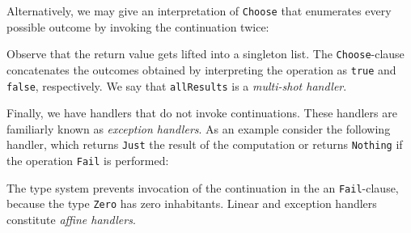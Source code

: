 \documentclass[preprint,numbers]{sigplanconf}
\newcommand{\msgbox}[2]{{%
  \par\noindent\small\color{red}%
  \framebox{\parbox{\dimexpr\linewidth-2\fboxsep-2\fboxrule}{\textbf{#1:} #2}}%
}}
\newcommand{\kc}[1]{\msgbox{KC}{#1}}
\begin{document}
Alternatively, we may give an interpretation of \lstinline$Choose$
that enumerates every possible outcome by invoking the continuation
twice:
%

%
Observe that the return value gets lifted into a singleton list. The
\lstinline$Choose$-clause concatenates the outcomes obtained by
interpreting the operation as \lstinline$true$ and \lstinline$false$,
respectively. We say that \lstinline$allResults$ is a \emph{multi-shot
  handler}.

Finally, we have handlers that do not invoke continuations. These
handlers are familiarly known as \emph{exception handlers}. As an
example consider the following handler, which returns \lstinline$Just$
the result of the computation or returns \lstinline$Nothing$ if the
operation \lstinline$Fail$ is performed:
%

%
The type system prevents invocation of the continuation in the an
\lstinline$Fail$-clause, because the type \lstinline$Zero$ has zero
inhabitants. Linear and exception handlers constitute \emph{affine
  handlers}.

\end{document}
